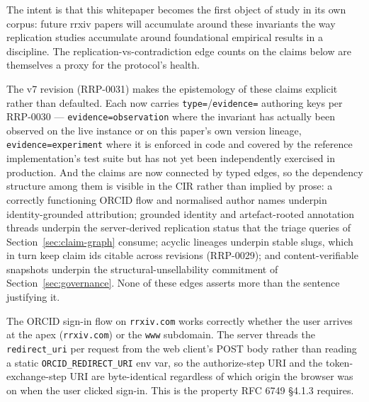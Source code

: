 \documentclass[11pt]{rrxiv}
\begin{document}
The intent is that this whitepaper becomes the first object of study in its own corpus: future rrxiv papers will accumulate around these invariants the way replication studies accumulate around foundational empirical results in a discipline. The replication-vs-contradiction edge counts on the claims below are themselves a proxy for the protocol's health.

The v7 revision (RRP-0031) makes the epistemology of these claims explicit rather than defaulted. Each now carries \texttt{type=}/\texttt{evidence=} authoring keys per RRP-0030 --- \texttt{evidence=observation} where the invariant has actually been observed on the live instance or on this paper's own version lineage, \texttt{evidence=experiment} where it is enforced in code and covered by the reference implementation's test suite but has not yet been independently exercised in production. And the claims are now connected by typed edges, so the dependency structure among them is visible in the CIR rather than implied by prose: a correctly functioning ORCID flow and normalised author names underpin identity-grounded attribution; grounded identity and artefact-rooted annotation threads underpin the server-derived replication status that the triage queries of Section~\ref{sec:claim-graph} consume; acyclic lineages underpin stable slugs, which in turn keep claim ids citable across revisions (RRP-0029); and content-verifiable snapshots underpin the structural-unsellability commitment of Section~\ref{sec:governance}. None of these edges asserts more than the sentence justifying it.

\begin{claim}[title=Origin-agnostic OAuth, type=empirical, evidence=observation, labels={protocol-invariant, live-instance}]
\label{claim:origin-agnostic-oauth}
The ORCID sign-in flow on \texttt{rrxiv.com} works correctly whether the user arrives at the apex (\texttt{rrxiv.com}) or the \texttt{www} subdomain. The server threads the \texttt{redirect\_uri} per request from the web client's POST body rather than reading a static \texttt{ORCID\_REDIRECT\_URI} env var, so the authorize-step URI and the token-exchange-step URI are byte-identical regardless of which origin the browser was on when the user clicked sign-in. This is the property RFC 6749 \S4.1.3 requires.
\end{claim}
\end{document}

